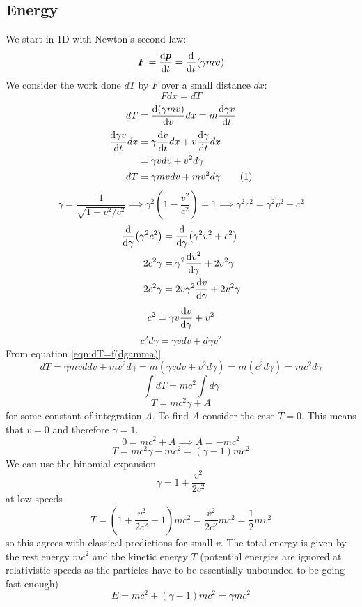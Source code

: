 \documentclass{article}
\begin{document}
    \subsection{Energy}
    We start in 1D with Newton's second law:
    \[\bm{F} = \dv{\bm{p}}{t} = \dv{t}(\gamma m\bm{v})\]
    We consider the work done \(dT\) by \(F\) over a small distance \(dx\):
    \[Fdx = dT\]
    \[dT = \dv{(\gamma mv)}{v}dx = m\dv{\gamma v}{t}\]
    \begin{align*}
        \dv{\gamma v}{t}dx &= \gamma\dv{v}{t}dx + v\dv{\gamma}{t}dx\\
        &= \gamma vdv + v^2d\gamma\\
        dT &= \gamma mv dv + mv^2 d\gamma\label{eqn:dT=f(dgamma)}\stepcounter{equation}\tag{\theequation}
    \end{align*}
    \[\gamma = \frac{1}{\sqrt{1- v^2/c^2}}\implies \gamma^2\left(1 - \frac{v^2}{c^2}\right) = 1\implies\gamma^2c^2 = \gamma^2v^2 + c^2\]
    \begin{align*}
    \dv{\gamma}(\gamma^2c^2) &= \dv{\gamma}(\gamma^2v^2 + c^2)\\
    2c^2\gamma &= \gamma^2\dv{v^2}{\gamma} + 2v^2\gamma\\
    2c^2\gamma &= 2v\gamma^2\dv{v}{\gamma} + 2v^2\gamma
    \end{align*}
    \[c^2 = \gamma v\dv{v}{\gamma} + v^2\]
    \[c^2d\gamma = \gamma vdv + d\gamma v^2\]
    From equation \ref{eqn:dT=f(dgamma)}
    \[dT = \gamma mvddv + mv^2d\gamma = m(\gamma vdv + v^2d\gamma) = m(c^2 d\gamma) = mc^2 d\gamma\]
    \[\int dT = mc^2\int d\gamma\]
    \[T = mc^2\gamma + A\]
    for some constant of integration \(A\).
    To find \(A\) consider the case \(T = 0\).
    This means that \(v = 0\) and therefore \(\gamma = 1\).
    \[0 = mc^2 + A\implies A = -mc^2\]
    \[T = mc^2\gamma - mc^2 = (\gamma - 1)mc^2\]
    We can use the binomial expansion
    \[\gamma = 1 + \frac{v^2}{2c^2}\]
    at low speeds
    \[T = (1 + \frac{v^2}{2c^2} - 1)mc^2 = \frac{v^2}{2c^2}mc^2 = \frac{1}{2}mv^2\]
    so this agrees with classical predictions for small \(v\).
    The total energy is given by the rest energy \(mc^2\) and the kinetic energy \(T\) (potential energies are ignored at relativistic speeds as the particles have to be essentially unbounded to be going fast enough)
    \[E = mc^2 + (\gamma - 1)mc^2 = \gamma mc^2\]
    
\end{document}
